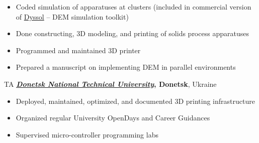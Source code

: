 \documentclass[
  a4paper
]{../FortySecondsCV/fortysecondscv}
\renewcommand{\emph}[1]{\textcolor{cyan!75!black!120}{\textbf{#1}}}
\begin{document}
\begin{cvtable}[1]
{{\begin{itemize}[leftmargin=*]
              (DEM) for simulating granular flows on \href{https://en.wikipedia.org/wiki/Computer_cluster}{computer clusters}
            \item Coded simulation of apparatuses at clusters
              (included in commercial version of \href{https://www.dyssoltec.com/the-software}{Dyssol} -- DEM simulation toolkit)
            \item Done constructing, 3D modeling, and printing of solids process apparatuses
            \item Programmed and maintained 3D printer
            \item Prepared a manuscript on implementing DEM in parallel environments
            \end{itemize}
          }
          {\scriptsize
          }
         }
\end{cvtable}


\begin{cvtable}[1]
         {TA}
         {\emph{\href{https://donntu.edu.ua/en/knt-en}{\it Donetsk National Technical University}, Donetsk}, Ukraine }
         {\footnotesize \setlength\parindent{0pt}\setlength{\parskip}{-1.em}
           \begin{itemize}%
             \setlength\itemsep{-.5em}
             \item Deployed, maintained, optimized, and documented 3D printing infrastructure
             \item Organized regular University OpenDays and Career Guidances
             \item Supervised micro-controller programming labs
            \end{itemize}
         }
\end{cvtable}

\newpage
\makebacksidebar
\end{document}
